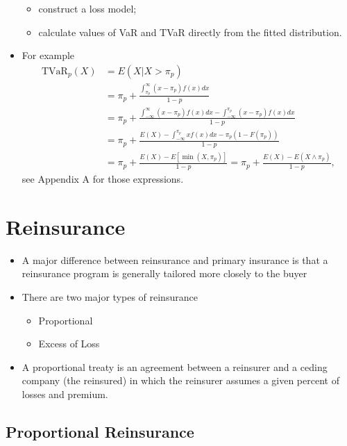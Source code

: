 \documentclass[]{book}
\theoremstyle{definition}
\theoremstyle{definition}
\theoremstyle{definition}
\theoremstyle{remark}
\begin{document}
\begin{itemize}
  \begin{itemize}
  \item
    construct a loss model;
  \item
    calculate values of VaR and TVaR directly from the fitted
    distribution.
  \end{itemize}
\item
  For example \[\begin{aligned}
    \text{TVaR}_p(X) &= E(X|X>\pi_p) \\
  &= \pi_p + \frac{\int_{\pi_p}^{\infty} (x-\pi_p) f(x) dx}{1-p} \\
  &= \pi_p + \frac{\int_{-\infty}^{\infty} (x-\pi_p) f(x) dx -\int_{-\infty}^{\pi_p} (x-\pi_p) f(x) dx }{1-p} \\
  &= \pi_p + \frac{E(X)-\int_{-\infty}^{\pi_p} xf(x) dx -\pi_p (1-F(\pi_p))}{1-p} \\
  &= \pi_p + \frac{E(X) - E[\min{(X,\pi_p)}]}{1-p} = \pi_p + \frac{E(X)-E(X \wedge \pi_p)}{1-p},\end{aligned}\]
  see Appendix A for those expressions.
\end{itemize}

\section{Reinsurance}\label{reinsurance-1}

\begin{itemize}
\item
  A major difference between reinsurance and primary insurance is that a
  reinsurance program is generally tailored more closely to the buyer
\item
  There are two major types of reinsurance

  \begin{itemize}
  \item
    Proportional
  \item
    Excess of Loss
  \end{itemize}
\item
  A proportional treaty is an agreement between a reinsurer and a ceding
  company (the reinsured) in which the reinsurer assumes a given percent
  of losses and premium.
\end{itemize}

\subsection{Proportional Reinsurance}\label{proportional-reinsurance}
\end{document}

